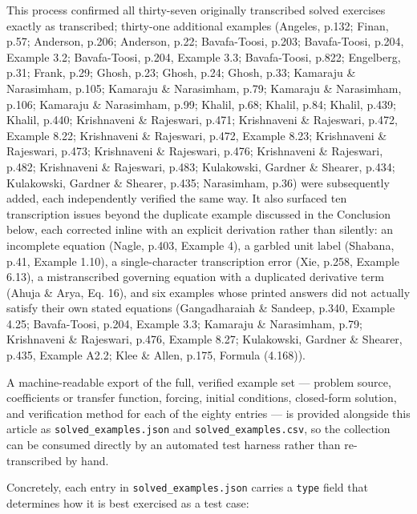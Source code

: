 \documentclass[
  11pt,
]{article}
\begin{document}
This process confirmed all thirty-seven originally transcribed solved
exercises exactly as transcribed; thirty-one additional examples
(Angeles, p.132; Finan, p.57; Anderson, p.206; Anderson, p.22;
Bavafa-Toosi, p.203; Bavafa-Toosi, p.204, Example 3.2; Bavafa-Toosi,
p.204, Example 3.3; Bavafa-Toosi, p.822; Engelberg, p.31; Frank, p.29;
Ghosh, p.23; Ghosh, p.24; Ghosh, p.33; Kamaraju \& Narasimham, p.105;
Kamaraju \& Narasimham, p.79; Kamaraju \& Narasimham, p.106; Kamaraju \&
Narasimham, p.99; Khalil, p.68; Khalil, p.84; Khalil, p.439; Khalil,
p.440; Krishnaveni \& Rajeswari, p.471; Krishnaveni \& Rajeswari, p.472,
Example 8.22; Krishnaveni \& Rajeswari, p.472, Example 8.23; Krishnaveni
\& Rajeswari, p.473; Krishnaveni \& Rajeswari, p.476; Krishnaveni \&
Rajeswari, p.482; Krishnaveni \& Rajeswari, p.483; Kulakowski, Gardner
\& Shearer, p.434; Kulakowski, Gardner \& Shearer, p.435; Narasimham,
p.36) were subsequently added, each independently verified the same way.
It also surfaced ten transcription issues beyond the duplicate example
discussed in the Conclusion below, each corrected inline with an
explicit derivation rather than silently: an incomplete equation (Nagle,
p.403, Example 4), a garbled unit label (Shabana, p.41, Example 1.10), a
single-character transcription error (Xie, p.258, Example 6.13), a
mistranscribed governing equation with a duplicated derivative term
(Ahuja \& Arya, Eq. 16), and six examples whose printed answers did not
actually satisfy their own stated equations (Gangadharaiah \& Sandeep,
p.340, Example 4.25; Bavafa-Toosi, p.204, Example 3.3; Kamaraju \&
Narasimham, p.79; Krishnaveni \& Rajeswari, p.476, Example 8.27;
Kulakowski, Gardner \& Shearer, p.435, Example A2.2; Klee \& Allen,
p.175, Formula (4.168)).

A machine-readable export of the full, verified example set --- problem
source, coefficients or transfer function, forcing, initial conditions,
closed-form solution, and verification method for each of the eighty
entries --- is provided alongside this article as
\texttt{solved\_examples.json} and \texttt{solved\_examples.csv}, so the
collection can be consumed directly by an automated test harness rather
than re-transcribed by hand.

Concretely, each entry in \texttt{solved\_examples.json} carries a
\texttt{type} field that determines how it is best exercised as a test
case:
\end{document}
